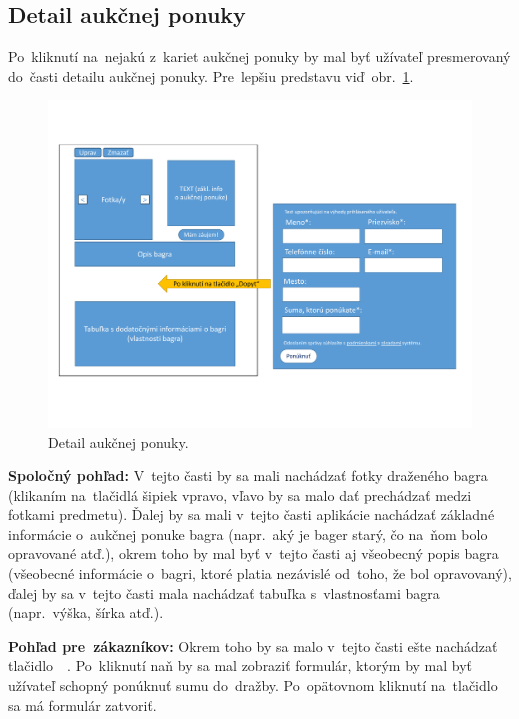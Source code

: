 \subsection{Detail aukčnej ponuky}
\label{detail aukcnej ponuky}

Po~kliknutí na~nejakú z~kariet aukčnej ponuky by mal byť užívateľ presmerovaný do~časti detailu aukčnej ponuky. Pre~lepšiu predstavu viď~obr.~\ref{auction offer detail}.

\begin{figure}[H]\centering
\includegraphics[width=140mm]{../img/UI concept/auction offer detail}
\caption{Detail aukčnej ponuky.}
\label{auction offer detail}
\end{figure}

\textbf{Spoločný pohľad:} V~tejto časti by sa mali nachádzať fotky draženého bagra (klikaním na~tlačidlá šipiek vpravo, vľavo by sa malo dať prechádzať medzi fotkami predmetu). Ďalej by sa mali v~tejto časti aplikácie nachádzať základné informácie o~aukčnej ponuke bagra (napr.~aký je bager starý, čo na~ňom bolo opravované atď.), okrem toho by mal byť v~tejto časti aj všeobecný popis bagra (všeobecné informácie o~bagri, ktoré platia nezávislé od~toho, že bol opravovaný), ďalej by sa v~tejto časti mala nachádzať tabuľka s~vlastnosťami bagra (napr.~výška, šírka atď.).

\textbf{Pohľad pre~zákazníkov:} Okrem toho by sa malo v~tejto časti ešte nachádzať tlačidlo~~. Po~kliknutí naň by sa mal zobraziť formulár, ktorým by mal byť užívateľ schopný ponúknuť sumu do~dražby. Po~opätovnom kliknutí na~tlačidlo sa má formulár zatvoriť.

